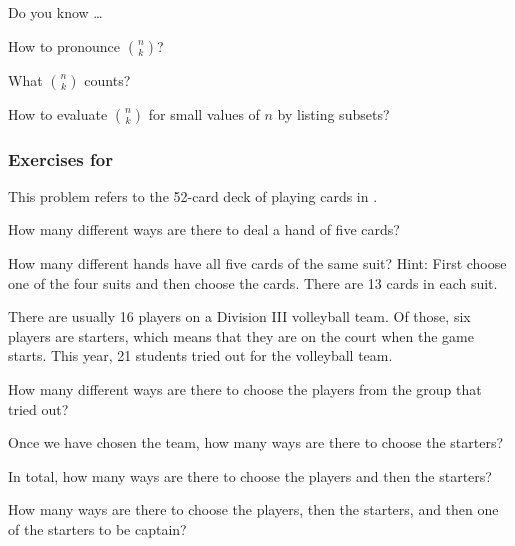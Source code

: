 \begin{exer}[\exerR] %
\label{exer_dyk_binomial_coeffs}
    Do you know \ldots
        \begin{exerpart}
            \item How to pronounce $\binom{n}{k}$?
            \item What $\binom{n}{k}$ counts?
            \item How to evaluate $\binom{n}{k}$ for small values of $n$ by listing subsets?      
        \end{exerpart}
\end{exer}

\subsubsection*{Exercises for  \subcombinecount}

\begin{exer} [\exerP] %
\label{exer_5card_hands}
This problem refers to the 52-card deck of playing cards in .
    \begin{exerpart}
        \item How many different ways are there to deal a hand of five cards?  
        \item How many different hands have all five cards of the same suit?  Hint: First choose one of the four suits and then choose the cards.  There are 13 cards in each suit.
    \end{exerpart}
\end{exer}

\begin{exer}[\exerP] %
\label{exer_volleyball}
  There are usually 16 players on a Division III volleyball team.  Of those, six players are starters, which means that they are on the court when the game starts.  This year, 21 students tried out for the volleyball team.
      \begin{exerpart}
          \item How many different ways are there to choose the players from the group that tried out?
          \item Once we have chosen the team, how many ways are there to choose the starters?
          \item In total, how many ways are there to choose the players and then the starters?
          \item How many ways are there to choose the players, then the starters, and then one of the starters to be captain?
      \end{exerpart} 
\end{exer}

